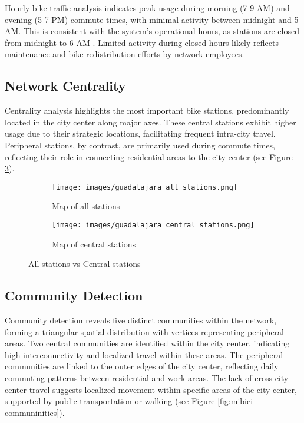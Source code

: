 \documentclass[conference]{IEEEtran}
\begin{document}
Hourly bike traffic analysis indicates peak usage during morning (7-9 AM) and evening (5-7 PM) commute times, with minimal activity between midnight and 5 AM. This is consistent with the system's operational hours, as stations are closed from midnight to 6 AM \cite{mibici2023}. Limited activity during closed hours likely reflects maintenance and bike redistribution efforts by network employees.

\subsection{Network Centrality}
Centrality analysis highlights the most important bike stations, predominantly located in the city center along major axes. These central stations exhibit higher usage due to their strategic locations, facilitating frequent intra-city travel. Peripheral stations, by contrast, are primarily used during commute times, reflecting their role in connecting residential areas to the city center (see Figure \ref{fig:side_by_side}).

\begin{figure}[htbp]
    \centering
    \begin{subfigure}[b]{0.20\textwidth}
        \centering
        \texttt{[image: images/guadalajara\_all\_stations.png]}
        \caption{Map of all stations}
        \label{fig:network}
    \end{subfigure}
    \hfill
    \begin{subfigure}[b]{0.20\textwidth}
        \centering
        \texttt{[image: images/guadalajara\_central\_stations.png]}
        \caption{Map of central stations}
        \label{fig:map}
    \end{subfigure}
    \caption{All stations vs Central stations}
    \label{fig:side_by_side}
\end{figure}

\subsection{Community Detection}
Community detection reveals five distinct communities within the network, forming a triangular spatial distribution with vertices representing peripheral areas. Two central communities are identified within the city center, indicating high interconnectivity and localized travel within these areas. The peripheral communities are linked to the outer edges of the city center, reflecting daily commuting patterns between residential and work areas. The lack of cross-city center travel suggests localized movement within specific areas of the city center, supported by public transportation or walking (see Figure \ref{fig:mibici-communinities}).
\end{document}
